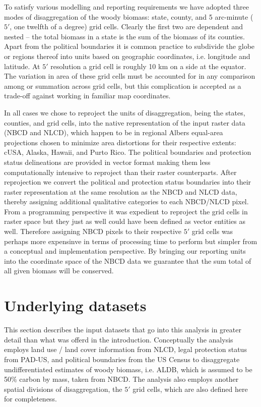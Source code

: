 \documentclass[11pt]{article}
\begin{document}
To satisfy various modelling and reporting requirements we have
adopted three modes of disaggregation of the woody biomass: state,
county, and 5 arc-minute ($5'$, one twelfth of a degree) grid cells.
Clearly the first two are dependent and nested -- the total biomass in
a state is the sum of the biomass of its counties.  Apart from the
political boundaries it is common practice to subdivide the globe or
regions thereof into units based on geographic coordinates,
i.e. longitude and latitude.  At $5'$ resolution a grid cell is
roughly 10 km on a side at the equator.  The variation in area of
these grid cells must be accounted for in any comparison among or
summation across grid cells, but this complication is accepted as a
trade-off against working in familiar map coordinates.

In all cases we chose to reproject the units of disaggregation, being
the states, counties, and grid cells, into the native representation
of the input raster data (NBCD and NLCD), which happen to be in
regional Albers equal-area projections chosen to minimize area
distortions for their respective extents: cUSA, Alaska, Hawaii, and
Purto Rico.  The political boundaries and protection status
delineations are provided in vector format making them less
computationally intensive to reproject than their raster counterparts.
After reprojection we convert the political and protection status
boundaries into their raster representation at the same resolution as
the NBCD and NLCD data, thereby assigning additional qualitative
categories to each NBCD/NLCD pixel.  From a programming perspective it
was expedient to reproject the grid cells in raster space but they
just as well could have been defined as vector entities as well.
Therefore assigning NBCD pixels to their respective $5'$ grid cells
was perhaps more expensinve in terms of processing time to perform but
simpler from a conceptual and implementation perspective.  By bringing
our reporting units into the coordinate space of the NBCD data we
guarantee that the sum total of all given biomass will be conserved.
\section{Underlying datasets}
\label{sec-2}


This section describes the input datasets that go into this analysis
in greater detail than what was offerd in the introduction.
Conceptually the analysis employs land use / land cover information
from NLCD, legal protection status from PAD-US, and political
boundaries from the US Census to disaggregate undifferentiated
estimates of woody biomass, i.e. ALDB, which is assumed to be 50\%
carbon by mass, taken from NBCD.  The analysis also employs another
spatial divisions of disaggregation, the $5'$ grid cells, which are
also defined here for completeness.
\end{document}
